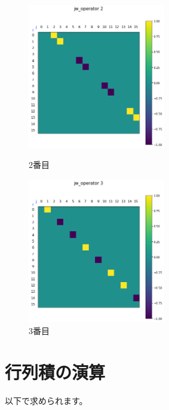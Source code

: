 \documentclass[a4paper, 10pt, dvipdfmx]{jlreq}
\begin{document}
\begin{figure}[htbp]
    \begin{minipage}{0.45\hsize}
        \begin{center}
            \includegraphics[width=60mm]{jw_operators/2.png}
        \end{center}
        \caption{2番目}
    \end{minipage}
    \begin{minipage}{0.45\hsize}
        \begin{center}
            \includegraphics[width=60mm]{jw_operators/3.png}
        \end{center}
        \caption{3番目}
    \end{minipage}
\end{figure}

\newpage

\section{行列積の演算}

以下で求められます。
\end{document}
